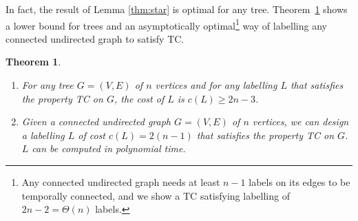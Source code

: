\documentclass[a4paper,UKenglish]{article}
\newtheorem{theorem}{Theorem}
\begin{document}
In fact, the result of Lemma \ref{thm:star} is optimal for any tree. Theorem~\ref{thm:thmdesign} shows a lower bound for trees and an asymptotically optimal\footnote{Any connected undirected graph needs at least $n-1$ labels on its edges to be temporally connected, and we show a TC satisfying labelling of $2n-2=\Theta(n)$ labels.} way of labelling any connected undirected graph to satisfy TC.


\begin{theorem}\label{thm:thmdesign}
\begin{enumerate}[label=(\alph*)]
\item For any tree $G=(V,E)$ of $n$ vertices and for any labelling $L$ that satisfies the property TC on $G$, the cost of $L$ is $c(L) \geq 2n-3$.
\item Given a connected undirected graph $G=(V,E)$ of $n$ vertices, we can design a labelling $L$ of cost $c(L) = 2(n-1)$ that satisfies the property TC on $G$. $L$ can be computed in polynomial time.
\end{enumerate}
\end{theorem}
\end{document}
